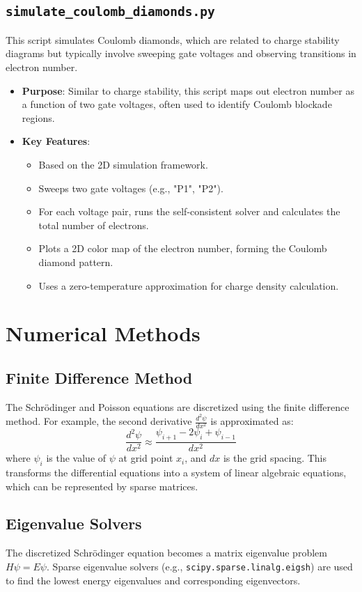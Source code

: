 \documentclass{article}
\begin{document}
\subsection{\texttt{simulate\_coulomb\_diamonds.py}}
This script simulates Coulomb diamonds, which are related to charge stability diagrams but typically involve sweeping gate voltages and observing transitions in electron number.
\begin{itemize}
    \item \textbf{Purpose}: Similar to charge stability, this script maps out electron number as a function of two gate voltages, often used to identify Coulomb blockade regions.
    \item \textbf{Key Features}:
        \begin{itemize}
            \item Based on the 2D simulation framework.
            \item Sweeps two gate voltages (e.g., "P1", "P2").
            \item For each voltage pair, runs the self-consistent solver and calculates the total number of electrons.
            \item Plots a 2D color map of the electron number, forming the Coulomb diamond pattern.
            \item Uses a zero-temperature approximation for charge density calculation.
        \end{itemize}
\end{itemize}

\section{Numerical Methods}
\subsection{Finite Difference Method}
The Schrödinger and Poisson equations are discretized using the finite difference method. For example, the second derivative $\frac{d^2\psi}{dx^2}$ is approximated as:
\begin{equation}
    \frac{d^2\psi}{dx^2} \approx \frac{\psi_{i+1} - 2\psi_i + \psi_{i-1}}{dx^2}
\end{equation}
where $\psi_i$ is the value of $\psi$ at grid point $x_i$, and $dx$ is the grid spacing. This transforms the differential equations into a system of linear algebraic equations, which can be represented by sparse matrices.

\subsection{Eigenvalue Solvers}
The discretized Schrödinger equation becomes a matrix eigenvalue problem $H\psi = E\psi$. Sparse eigenvalue solvers (e.g., \texttt{scipy.sparse.linalg.eigsh}) are used to find the lowest energy eigenvalues and corresponding eigenvectors.
\end{document}
